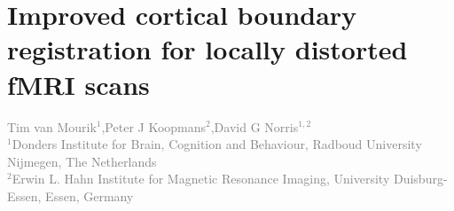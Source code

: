 
\chapter{Improved cortical boundary registration for locally distorted fMRI scans}
\label{ch:registration}

\textcolor{gray}{{Tim van Mourik$^{1}$},Peter J Koopmans$^{2}$,David G Norris$^{1,2}$\\
$^{1}$Donders Institute for Brain, Cognition and Behaviour, Radboud University Nijmegen, The Netherlands\\
$^{2}$Erwin L. Hahn Institute for Magnetic Resonance Imaging, University Duisburg-Essen, Essen, Germany}\\

\linespread{1.5}
\newpage







